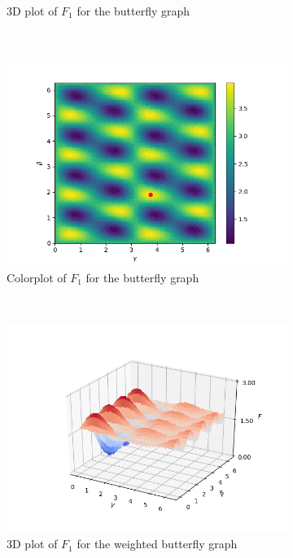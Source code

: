 \begin{figure}[H]
\begin{subfigure}[t]{0.5\textwidth}
		\caption{3D plot of $F_1$ for the butterfly graph}
	\end{subfigure}%
	~ 
	\begin{subfigure}[t]{0.5\textwidth}
		\centering
		\includegraphics[width=\textwidth]{figures/landscape_new/butterfly_imshow.png}
		\caption{Colorplot of $F_1$ for the butterfly graph}
	\end{subfigure}
	\\
	\centering
	\begin{subfigure}[t]{0.5\textwidth}
	\centering
	\includegraphics[width=\textwidth]{figures/landscape_new/butterfly_weighted_3D.png}
	\caption{3D plot of $F_1$ for the weighted butterfly graph}
	\end{subfigure}%
	~ 
	\begin{subfigure}[t]{0.5\textwidth}

\end{subfigure}
\end{figure}
